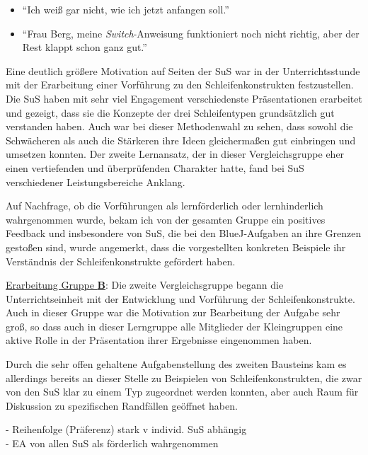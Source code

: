 \documentclass[paper=a4, DIV=13, BCOR=12mm, twoside=on, onecolumn=on, open = any, titlepage =on, parskip =half-, headsepline = on, footsepline = on, chapterprefix = on, sectionprefix = on, appendixprefix = off, fontsize = 11pt, numbers = noenddot, abstract = off]{scrreprt}
\begin{document}
\singlespacing
\begin{itemize}
\item "`Ich weiß gar nicht, wie ich jetzt anfangen soll."'
\item "`Frau Berg, meine \emph{Switch}-Anweisung funktioniert noch nicht richtig, aber der Rest klappt schon ganz gut."'
\end{itemize}
\onehalfspacing

Eine deutlich größere Motivation auf Seiten der SuS war in der Unterrichtsstunde mit der Erarbeitung einer Vorführung zu den Schleifenkonstrukten festzustellen. Die SuS haben mit sehr viel Engagement verschiedenste Präsentationen erarbeitet und gezeigt, dass sie die Konzepte der drei Schleifentypen grundsätzlich gut verstanden haben. Auch war bei dieser Methodenwahl zu sehen, dass sowohl die Schwächeren als auch die Stärkeren ihre Ideen gleichermaßen gut einbringen und umsetzen konnten.
Der zweite Lernansatz, der in dieser Vergleichsgruppe eher einen vertiefenden und überprüfenden Charakter hatte, fand bei SuS verschiedener Leistungsbereiche Anklang.

Auf Nachfrage, ob die Vorführungen als lernförderlich oder lernhinderlich wahrgenommen wurde, bekam ich von der gesamten Gruppe ein positives Feedback und insbesondere von SuS, die bei den BlueJ-Aufgaben an ihre Grenzen gestoßen sind, wurde angemerkt, dass die vorgestellten konkreten Beispiele ihr Verständnis der Schleifenkonstrukte gefördert haben.


\underline{Erarbeitung Gruppe \textsc{\textbf{B}}}: Die zweite Vergleichsgruppe begann die Unterrichtseinheit mit der Entwicklung und Vorführung der Schleifenkonstrukte. Auch in dieser Gruppe war die Motivation zur Bearbeitung der Aufgabe sehr groß, so dass auch in dieser Lerngruppe alle Mitglieder der Kleingruppen eine aktive Rolle in der Präsentation ihrer Ergebnisse eingenommen haben.

Durch die sehr offen gehaltene Aufgabenstellung des zweiten Bausteins kam es allerdings bereits an dieser Stelle zu Beispielen von Schleifenkonstrukten, die zwar von den SuS klar zu einem Typ zugeordnet werden konnten, aber auch Raum für Diskussion zu spezifischen Randfällen geöffnet haben. 


- Reihenfolge (Präferenz) stark v individ. SuS abhängig\\
- EA von allen SuS als förderlich wahrgenommen\\



\par \singlespacing
\end{document}
